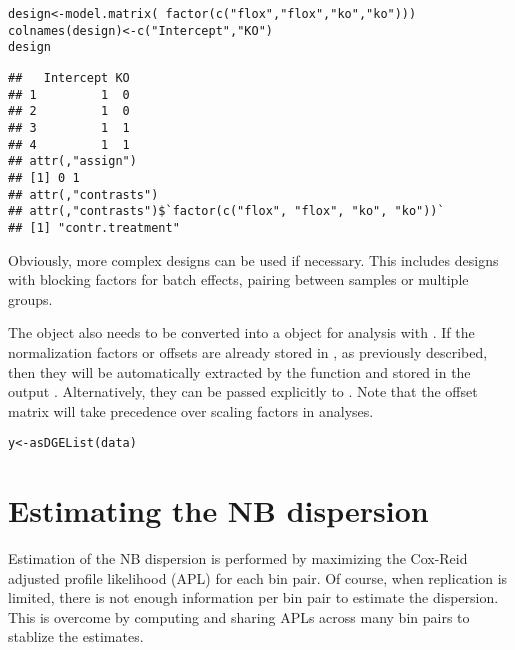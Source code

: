 \documentclass{report}\usepackage[]{graphicx}\usepackage[usenames,dvipsnames]{color}
\newcommand{\hlstr}[1]{\textcolor[rgb]{0.251,0.627,0.251}{#1}}%
\newcommand{\hlopt}[1]{\textcolor[rgb]{0,0,0}{#1}}%
\newcommand{\hlstd}[1]{\textcolor[rgb]{0.251,0.251,0.251}{#1}}%
\newcommand{\hlkwb}[1]{\textcolor[rgb]{0,0,0}{#1}}%
\newcommand{\hlkwd}[1]{\textcolor[rgb]{0.878,0.439,0.125}{#1}}%
\newenvironment{knitrout}{}{} %
\begin{document}
\begin{knitrout}
\color{fgcolor}\begin{kframe}
\begin{alltt}
\hlstd{design} \hlkwb{<-} \hlkwd{model.matrix}\hlstd{(}\hlopt{~}\hlkwd{factor}\hlstd{(}\hlkwd{c}\hlstd{(}\hlstr{"flox"}\hlstd{,} \hlstr{"flox"}\hlstd{,} \hlstr{"ko"}\hlstd{,} \hlstr{"ko"}\hlstd{)))}
\hlkwd{colnames}\hlstd{(design)} \hlkwb{<-} \hlkwd{c}\hlstd{(}\hlstr{"Intercept"}\hlstd{,} \hlstr{"KO"}\hlstd{)}
\hlstd{design}
\end{alltt}
\begin{verbatim}
##   Intercept KO
## 1         1  0
## 2         1  0
## 3         1  1
## 4         1  1
## attr(,"assign")
## [1] 0 1
## attr(,"contrasts")
## attr(,"contrasts")$`factor(c("flox", "flox", "ko", "ko"))`
## [1] "contr.treatment"
\end{verbatim}
\end{kframe}
\end{knitrout}

Obviously, more complex designs can be used if necessary.
This includes designs with blocking factors for batch effects, pairing between samples or multiple groups.

The  object also needs to be converted into a  object for analysis with .
If the normalization factors or offsets are already stored in , as previously described, then they will be automatically extracted by the  function and stored in the output .
Alternatively, they can be passed explicitly to .
Note that the offset matrix will take precedence over scaling factors in  analyses.

\begin{knitrout}
\color{fgcolor}\begin{kframe}
\begin{alltt}
\hlstd{y} \hlkwb{<-} \hlkwd{asDGEList}\hlstd{(data)}
\end{alltt}
\end{kframe}
\end{knitrout}

\section{Estimating the NB dispersion}
Estimation of the NB dispersion is performed by maximizing the Cox-Reid adjusted profile likelihood (APL) \cite{mccarthy2012glm} for each bin pair.
Of course, when replication is limited, there is not enough information per bin pair to estimate the dispersion.
This is overcome by computing and sharing APLs across many bin pairs to stablize the estimates.
\end{document}
